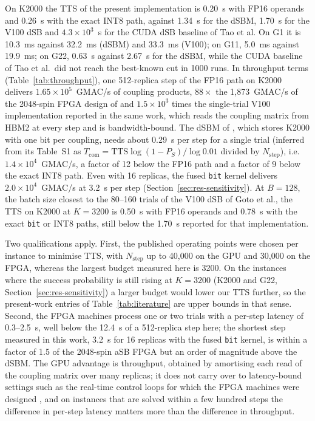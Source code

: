 \documentclass[11pt,a4paper]{article}
\newcommand{\code}[1]{\texttt{#1}}
\begin{document}
On K2000 the TTS of the present implementation is 0.20~s with FP16 operands and 0.26~s with the exact INT8 path, against 1.34~s for the dSBM, 1.70~s for the V100 dSB and $4.3\times10^{3}$~s for the CUDA dSB baseline of Tao et al. On G1 it is 10.3~ms against 32.2~ms (dSBM) and 33.3~ms (V100); on G11, 5.0~ms against 19.9~ms; on G22, 0.63~s against 2.67~s for the dSBM, while the CUDA baseline of Tao et al.\ did not reach the best-known cut in 1000 runs. In throughput terms (Table~\ref{tab:throughput}), one 512-replica step of the FP16 path on K2000 delivers $1.65\times10^{5}$~GMAC/s of coupling products, $88\times$ the 1,873~GMAC/s of the 2048-spin FPGA design of \cite{fpga2019} and $1.5\times10^{3}$ times the single-trial V100 implementation reported in the same work, which reads the coupling matrix from HBM2 at every step and is bandwidth-bound. The dSBM of \cite{goto2021}, which stores K2000 with one bit per coupling, needs about 0.29~\textmu s per step for a single trial (inferred from its Table~S1 as $T_{\mathrm{com}}=\mathrm{TTS}\log(1-P_S)/\log 0.01$ divided by $N_{\mathrm{step}}$), i.e.\ $1.4\times10^{4}$~GMAC/s, a factor of 12 below the FP16 path and a factor of 9 below the exact INT8 path. Even with 16 replicas, the fused \code{bit} kernel delivers $2.0\times10^{4}$~GMAC/s at 3.2~\textmu s per step (Section~\ref{sec:res-sensitivity}). At $B=128$, the batch size closest to the 80--160 trials of the V100 dSB of Goto et al., the TTS on K2000 at $K=3200$ is 0.50~s with FP16 operands and 0.78~s with the exact \code{bit} or INT8 paths, still below the 1.70~s reported for that implementation.

Two qualifications apply. First, the published operating points were chosen per instance to minimise TTS, with $N_{\mathrm{step}}$ up to 40,000 on the GPU and 30,000 on the FPGA, whereas the largest budget measured here is 3200. On the instances where the success probability is still rising at $K=3200$ (K2000 and G22, Section~\ref{sec:res-sensitivity}) a larger budget would lower our TTS further, so the present-work entries of Table~\ref{tab:literature} are upper bounds in that sense. Second, the FPGA machines process one or two trials with a per-step latency of 0.3--2.5~\textmu s, well below the 12.4~\textmu s of a 512-replica step here; the shortest step measured in this work, 3.2~\textmu s for 16 replicas with the fused \code{bit} kernel, is within a factor of 1.5 of the 2048-spin aSB FPGA but an order of magnitude above the dSBM. The GPU advantage is throughput, obtained by amortising each read of the coupling matrix over many replicas; it does not carry over to latency-bound settings such as the real-time control loops for which the FPGA machines were designed \cite{tatsumura2021heart}, and on instances that are solved within a few hundred steps the difference in per-step latency matters more than the difference in throughput.
\end{document}
